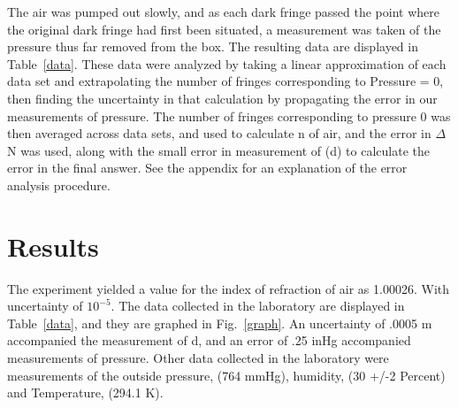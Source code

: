 \documentclass[aps,pre,twocolumn,nofootinbib]{revtex4}
\begin{document}
The air was pumped out slowly, and as each dark fringe passed the point where the original dark fringe had first been situated, a measurement was taken of the pressure thus far removed from the box.  The resulting data are displayed in Table~\ref{data}.  These data were analyzed by taking a linear approximation of each data set and extrapolating the number of fringes corresponding to Pressure = 0, then finding the uncertainty in that calculation by propagating the error in our measurements of pressure.  The number of fringes corresponding to pressure 0 was then averaged across data sets, and used to calculate n of air, and the error in  $\Delta$ N was used, along with the small error in measurement of (d) to calculate the error in the final answer.  See the appendix for an explanation of the error analysis procedure.  

\section{Results}

The experiment yielded a value for the index of refraction of air as 1.00026.  With uncertainty of $10^{-5}$.  The data collected in the laboratory are displayed in Table~\ref{data}, and they are graphed in Fig.~\ref{graph}.  An uncertainty of .0005 m accompanied the measurement of d, and an error of .25 inHg accompanied measurements of pressure.  Other data collected in the laboratory were measurements of the outside pressure, (764 mmHg), humidity, (30 +/-2 Percent) and Temperature, (294.1 K).  
\end{document}
